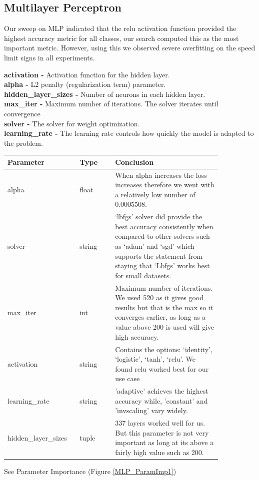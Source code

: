 \documentclass[11pt]{article}
\begin{document}
\newpage
\subsection{Multilayer Perceptron}

\par
\label{MLPSection}
Our sweep on MLP \cite{SklearnNeuralNetwork} indicated that the relu activation function provided the highest accuracy metric for all classes, our search computed this as the most important metric.
However, using this we observed severe overfitting on the speed limit signs in all experiments.

\textbf{activation -} Activation function for the hidden layer. \\
\textbf{alpha -} L2 penalty (regularization term) parameter. \\
\textbf{hidden\_layer\_sizes -} Number of neurons in each hidden layer. \\
\textbf{max\_iter -} Maximum number of iterations. The solver iterates until convergence \\
\textbf{solver -} The solver for weight optimization.\\
\textbf{learning\_rate -} The learning rate controls how quickly the model is adapted to the problem. \\


\begin{table}[ht]
  \centering
  \begin{tabular}{|p{0.25\linewidth} | p{0.15 \linewidth} | p{0.45\linewidth}|} 
    \hline
    \textbf{Parameter} & \textbf{Type} & \textbf{Conclusion} \\ \hline
    alpha & float & When alpha increases the loss increases therefore we went with a relatively low number of 0.0005508. \\ \hline 
    solver & string & ‘lbfgs’ solver did provide the best accuracy consistently when compared to other solvers such as ‘adam’ and ‘sgd’ which supports the statement from \cite{SklearnNeuralNetwork} staying that ‘Lbfgs’ works best for small datasets. \\ \hline
    max\_iter & int & Maximum number of iterations. We used 520 as it gives good results but that is the max so it converges earlier, as long as a value above 200 is used will give high accuracy. \\ \hline
    activation & string & Contains the options: ‘identity’, ‘logistic’, ‘tanh’, ‘relu’. We found relu worked best for our use case  \\ \hline  
    learning\_rate & string & 'adaptive' achieves the highest accuracy while, 'constant' and 'invscaling' vary widely. \\ \hline  
    hidden\_layer\_sizes & tuple & 337 layers worked well for us. But this parameter is not very important as long at its above a fairly high value such as 200. \\ \hline
  \end{tabular}
\end{table}\label{MLP_Analysis_Table}
\FloatBarrier
See Parameter Importance (Figure \ref{MLP_ParamImp1})
\end{document}
